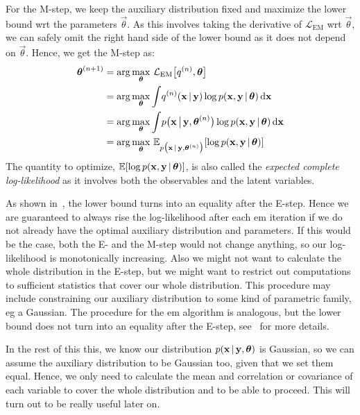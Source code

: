 		For the M-step, we keep the auxiliary distribution fixed and maximize the lower bound \ac{wrt} the parameters \(\vec{\theta}\). As this involves taking the derivative of \(\mathcal{L}_\mathrm{EM}\) \ac{wrt} \(\vec{\theta}\), we can safely omit the right hand side of the lower bound as it does not depend on \(\vec{\theta}\). Hence, we get the M-step as:
		\begin{align*}
			\boldsymbol{\mathrm{\theta}}^{(n + 1)}
				&= \arg\max_{\boldsymbol{\mathrm{\theta}}}\, \mathcal{L}_\mathrm{EM}\big[ q^{(n)}, \boldsymbol{\mathrm{\theta}} \big] \\
				&= \arg\max_{\boldsymbol{\mathrm{\theta}}} \int\! q^{(n)}(\boldsymbol{\mathrm{x}} \,\vert\, \boldsymbol{\mathrm{y}}) \log p(\boldsymbol{\mathrm{x}}, \boldsymbol{\mathrm{y}} \,\vert\, \boldsymbol{\mathrm{\theta}}) \dd{\boldsymbol{\mathrm{x}}} \\
				&= \arg\max_{\boldsymbol{\mathrm{\theta}}} \int\! p\big(\boldsymbol{\mathrm{x}} \,\big\vert\, \boldsymbol{\mathrm{y}}, \boldsymbol{\mathrm{\theta}}^{(n)}\big) \log p(\boldsymbol{\mathrm{x}}, \boldsymbol{\mathrm{y}} \,\vert\, \boldsymbol{\mathrm{\theta}}) \dd{\boldsymbol{\mathrm{x}}} \\
				&= \arg\max_{\boldsymbol{\mathrm{\theta}}}\, \mathbb{E}_{p\big(\boldsymbol{\mathrm{x}} \,\vert\, \boldsymbol{\mathrm{y}}, \boldsymbol{\mathrm{\theta}}^{(n)}\big)}[\log p(\boldsymbol{\mathrm{x}}, \boldsymbol{\mathrm{y}} \,\vert\, \boldsymbol{\mathrm{\theta}})]
		\end{align*}
		The quantity to optimize, \( \mathbb{E}[\log p(\boldsymbol{\mathrm{x}}, \boldsymbol{\mathrm{y}} \,\vert\, \boldsymbol{\mathrm{\theta}})] \), is also called the \emph{expected complete log-likelihood} as it involves both the observables and the latent variables.

		As shown in~\cite{bealVariationalAlgorithmsApproximate2003}, the lower bound turns into an equality after the E-step. Hence we are guaranteed to always rise the log-likelihood after each \ac{em} iteration if we do not already have the optimal auxiliary distribution and parameters. If this would be the case, both the E- and the M-step would not change anything, so our log-likelihood is monotonically increasing. Also we might not want to calculate the whole distribution in the E-step, but we might want to restrict out computations to sufficient statistics that cover our whole distribution. This procedure may include constraining our auxiliary distribution to some kind of parametric family, \ac{eg} a Gaussian. The procedure for the \ac{em} algorithm is analogous, but the lower bound does not turn into an equality after the E-step, see~\cite[49-51]{bealVariationalAlgorithmsApproximate2003} for more details.

		In the rest of this this, we know our distribution \( p(\boldsymbol{\mathrm{x}} \,\vert\, \boldsymbol{\mathrm{y}}, \boldsymbol{\mathrm{\theta}}) \) is Gaussian, so we can assume the auxiliary distribution to be Gaussian too, given that we set them equal. Hence, we only need to calculate the mean and correlation or covariance of each variable to cover the whole distribution and to be able to proceed. This will turn out to be really useful later on.


